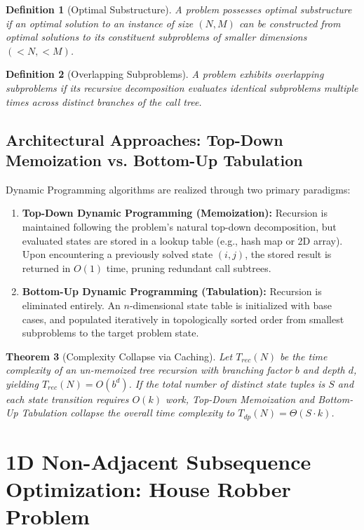 \documentclass[10pt,journal,compsoc,onecolumn]{IEEEtran}
\newtheorem{theorem}{Theorem}
\newtheorem{definition}[theorem]{Definition}
\begin{document}
\begin{definition}[Optimal Substructure]
A problem possesses optimal substructure if an optimal solution to an instance of size $(N, M)$ can be constructed from optimal solutions to its constituent subproblems of smaller dimensions $(< N, < M)$.
\end{definition}

\begin{definition}[Overlapping Subproblems]
A problem exhibits overlapping subproblems if its recursive decomposition evaluates identical subproblems multiple times across distinct branches of the call tree.
\end{definition}

\subsection{Architectural Approaches: Top-Down Memoization vs. Bottom-Up Tabulation}

Dynamic Programming algorithms are realized through two primary paradigms:

\begin{enumerate}
    \item \textbf{Top-Down Dynamic Programming (Memoization):} Recursion is maintained following the problem's natural top-down decomposition, but evaluated states are stored in a lookup table (e.g., hash map or 2D array). Upon encountering a previously solved state $(i,j)$, the stored result is returned in $O(1)$ time, pruning redundant call subtrees.
    \item \textbf{Bottom-Up Dynamic Programming (Tabulation):} Recursion is eliminated entirely. An $n$-dimensional state table is initialized with base cases, and populated iteratively in topologically sorted order from smallest subproblems to the target problem state.
\end{enumerate}

\begin{theorem}[Complexity Collapse via Caching]
Let $T_{rec}(N)$ be the time complexity of an un-memoized tree recursion with branching factor $b$ and depth $d$, yielding $T_{rec}(N) = O(b^d)$. If the total number of distinct state tuples is $S$ and each state transition requires $O(k)$ work, Top-Down Memoization and Bottom-Up Tabulation collapse the overall time complexity to $T_{dp}(N) = \Theta(S \cdot k)$.
\end{theorem}

\section{1D Non-Adjacent Subsequence Optimization: House Robber Problem}
\label{sec:house-robber}
\end{document}
